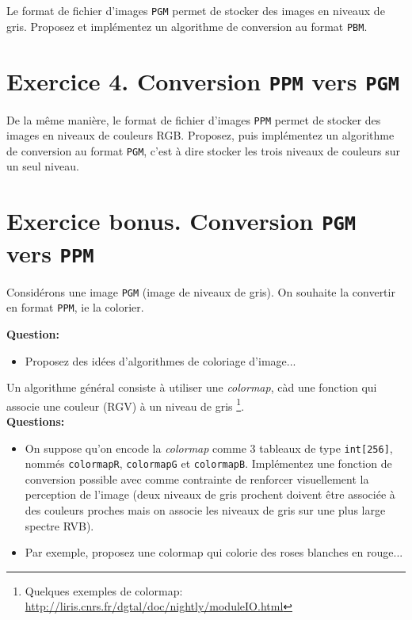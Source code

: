 \documentclass[a4paper, 11pt, french]{article}
\begin{document}
\par Le format de fichier d'images {\tt PGM} permet de stocker des images en niveaux de gris. Proposez et implémentez un algorithme de conversion au format {\tt PBM}.


\section*{\bf Exercice 4. \rm Conversion \texttt{PPM} vers \texttt{PGM}}

\par De la même manière, le format de fichier d'images {\tt PPM} permet de stocker des images en niveaux de couleurs RGB. Proposez, puis implémentez un algorithme de conversion au format \texttt{PGM}, c'est à dire stocker les trois niveaux de couleurs sur un seul niveau.

\section*{\bf Exercice bonus. \rm Conversion \texttt{PGM} vers \texttt{PPM}}

\par Considérons une image \texttt{PGM} (image de niveaux de gris). On souhaite la convertir en format \texttt{PPM}, ie la colorier.

\smallskip
\noindent \textbf{Question:}
\begin{itemize}
	\item Proposez des idées d'algorithmes de coloriage d'image...
\end{itemize}

\par Un algorithme général consiste à utiliser une \emph{colormap}, càd une fonction qui associe une couleur (RGV) à un niveau de gris \footnote{Quelques exemples de colormap: \url{http://liris.cnrs.fr/dgtal/doc/nightly/moduleIO.html}}.\\

\smallskip
\noindent \textbf{Questions:}
\begin{itemize}
	\item On suppose qu'on encode la \emph{colormap} comme 3
          tableaux de type \texttt{int[256]}, nommés
          \texttt{colormapR}, \texttt{colormapG} et
          \texttt{colormapB}. Implémentez une fonction de conversion
          possible avec comme contrainte de renforcer visuellement la
          perception de l'image (deux niveaux de gris prochent doivent
          être associée à des couleurs proches mais on associe les
          niveaux de gris sur une plus large spectre RVB).
	\item Par exemple, proposez une colormap qui colorie des roses blanches en rouge...
\end{itemize}
\end{document}
